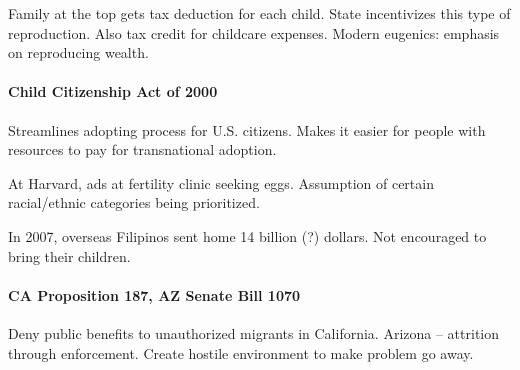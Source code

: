 Family at the top gets tax deduction for each child. State incentivizes this type of reproduction. Also tax credit for childcare expenses. Modern eugenics: emphasis on reproducing wealth.

\paragraph{Child Citizenship Act of 2000} Streamlines adopting process for U.S. citizens. Makes it easier for people with resources to pay for transnational adoption.

At Harvard, ads at fertility clinic seeking eggs. Assumption of certain racial/ethnic categories being prioritized.

In 2007, overseas Filipinos sent home 14 billion (?) dollars. Not encouraged to bring their children.

\paragraph{CA Proposition 187, AZ Senate Bill 1070}  Deny public benefits to unauthorized migrants in California. Arizona -- attrition through enforcement. Create hostile environment to make problem go away.